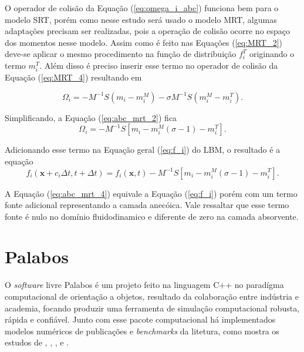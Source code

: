 O operador de colisão da Equação (\ref{eq:omega_i_abc}) funciona bem para o modelo SRT, porém como nesse estudo será usado o modelo MRT, algumas adaptações precisam ser realizadas, pois a operação de colisão ocorre no espaço dos momentos nesse modelo. Assim como é feito nas Equações (\ref{eq:MRT_2}) deve-se aplicar o mesmo procedimento na função de distribuição $f_{i}^{T}$ originando o termo $m_{i}^{T}$. Além disso é preciso inserir esse termo no operador de colisão da Equação (\ref{eq:MRT_4}) resultando em 

\begin{equation}
  \Omega_{i} = -\textbf{$M$}^{-1}\textbf{$S$}(m_{i} - m_{i}^{M}) - 
  \sigma\textbf{$M$}^{-1}\textbf{$S$}(m_{i}^{M} - m_{i}^{T}).
  \label{eq:abc_mrt_2}
\end{equation}

Simplificando, a Equação (\ref{eq:abc_mrt_2}) fica
\begin{equation}
  \Omega_{i} = -\textbf{$M$}^{-1}\textbf{$S$}[m_{i} - m_{i}^{M}(\sigma - 1) - m_{i}^{T}].
  \label{eq:abc_mrt_3}
\end{equation}

Adicionando esse termo na Equação geral (\ref{eq:f_i}) do LBM, o resultado é a equação
\begin{equation}
  f_{i}(\textbf{x} + c_{i}\Delta t, t + \Delta t) = f_{i}(\textbf{x}, t) -\textbf{$M$}^{-1}\textbf{$S$}[m_{i} - m_{i}^{M}(\sigma - 1) - m_{i}^{T}].
  \label{eq:abc_mrt_4}  
\end{equation}

A Equação (\ref{eq:abc_mrt_4}) equivale a Equação (\ref{eq:f_i}) porém com um termo fonte adicional representando a camada anecóica. Vale ressaltar que esse termo fonte é nulo no domínio fluidodinamico e diferente de zero na camada absorvente.

\section{Palabos}

O \textit{software} livre Palabos é um projeto feito na linguagem C++ no paradígma computacional de orientação a objetos, resultado da colaboração entre indústria e academia, focando produzir uma ferramenta de simulação computacional robusta, rápida e confiável. Junto com esse pacote computacional há implementados modelos numéricos de publicações e \textit{benchmarks} da litetura, como mostra os estudos de , , ,  e . 

